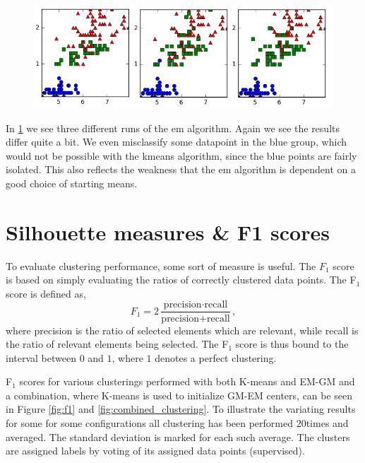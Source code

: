 \documentclass[a4paper,10pt,article,oneside,english]{memoir}
\let\oldcaption\caption
\renewcommand{\caption}[1]{\oldcaption{\emph{#1}}}
\begin{document}
\begin{figure}
	\centering
	\includegraphics[width=\textwidth]{em1.png}
	\caption{}
	\label{fig:em}
\end{figure}
In \ref{fig:em} we see three different runs of the em algorithm. Again we see the results differ quite a bit. We even misclassify some datapoint in the blue group, which would not be possible with the kmeans algorithm, since the blue points are fairly isolated. This also reflects the weakness that the em algorithm is dependent on a good choice of starting means.




\section*{Silhouette measures \& F1 scores}
To evaluate clustering performance, some sort of measure is useful. The $F_1$ score is based on simply evaluating the ratios of correctly clustered data points. The F$_1$ score is defined as,
$$F_1 = 2 \frac{\text{precision} \cdot \text{recall}}{\text{precision} + \text{recall}},$$
where precision is the ratio of selected elements which are relevant, while recall is the ratio of relevant elements being selected. The F$_1$ score is thus bound to the interval between $0$ and $1$, where $1$ denotes a perfect clustering. 

F$_1$ scores for various clusterings performed with both K-means and EM-GM and a combination, where K-means is used to initialize GM-EM centers, can be seen in Figure \ref{fig:f1} and \ref{fig:combined_clustering}. To illustrate the variating results for some for some configurations all clustering has been performed $20$times and averaged. The standard deviation is marked for each such average. The clusters are assigned labels by voting of its assigned data points (supervised).
\end{document}

